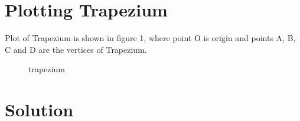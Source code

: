 \documentclass[journal,10pt,twocolumn]{article}
\begin{document}
\section{Plotting Trapezium}




\vspace{0.25cm}
Plot of Trapezium is shown in figure 1, where point O is origin and points A, B, C and D are the vertices of Trapezium.
\begin{figure}[h]

\caption{trapezium}
\label{fig:trapezium}
\end{figure}


\section{Solution}

\vspace{0.25cm}
\end{document}
